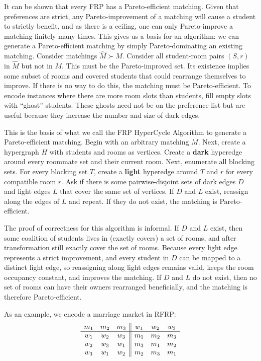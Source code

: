 \documentclass[11pt]{article}
\begin{document}
It can be shown that every FRP has a Pareto-efficient matching. Given that preferences are strict, any Pareto-improvement of a matching will cause a student to strictly benefit, and as there is a ceiling, one can only Pareto-improve a matching finitely many times. This gives us a basis for an algorithm: we can generate a Pareto-efficient matching by simply Pareto-dominating an existing matching. Consider matchings $\hat M \succ M$. Consider all student-room pairs $(S, r)$ in $\hat M$ but not in $M$. This must be the Pareto-improved set. Its existence implies some subset of rooms and covered students that could rearrange themselves to improve. If there is no way to do this, the matching must be Pareto-efficient. To encode instances where there are more room slots than students, fill empty slots with ``ghost'' students. These ghosts need not be on the preference list but are useful because they increase the number and size of dark edges.

This is the basis of what we call the FRP HyperCycle Algorithm to generate a Pareto-efficient matching. Begin with an arbitrary matching $M$. Next, create a hypergraph $H$ with students and rooms as vertices. Create a \textbf{dark} hyperedge around every roommate set and their current room. Next, enumerate all blocking sets. For every blocking set $T$, create a \textbf{light} hyperedge around $T$ and $r$ for every compatible room $r$. Ask if there is some pairwise-disjoint sets of dark edges $D$ and light edges $L$ that cover the same set of vertices. If $D$ and $L$ exist, reassign along the edges of $L$ and repeat. If they do not exist, the matching is Pareto-efficient.

The proof of correctness for this algorithm is informal. If $D$ and $L$ exist, then some coalition of students lives in (exactly covers) a set of rooms, and after transformation still exactly cover the set of rooms. Because every light edge represents a strict improvement, and every student in $D$ can be mapped to a distinct light edge, so reassigning along light edges remains valid, keeps the room occupancy constant, and improves the matching. If $D$ and $L$ do not exist, then no set of rooms can have their owners rearranged beneficially, and the matching is therefore Pareto-efficient.

As an example, we encode a marriage market in RFRP:
\[
\begin{array}{c c c || c c c}
m_1 & m_2 & m_3 & w_1 & w_2 & w_3\\\hline
w_1 & w_2 & w_3 & m_1 & m_2 & m_3\\
w_2 & w_3 & w_1 & m_3 & m_1 & m_2\\
w_3 & w_1 & w_2 & m_2 & m_3 & m_1
\end{array}
\]
\end{document}
